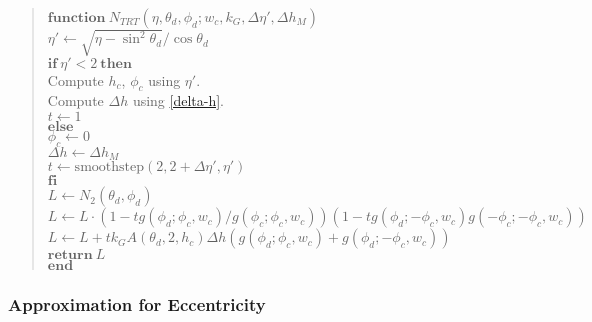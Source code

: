 \documentclass[10pt]{article}
\newcommand{\IF}{\mathbf{if}}
\newcommand{\FI}{\mathbf{fi}}
\newcommand{\THEN}{\mathbf{then}}
\newcommand{\ELSE}{\mathbf{else}}
\begin{document}
  \begin{verse}
    $\mathbf{function}\ N_{TRT}(\eta, \theta_d, \phi_d; w_c, k_G, \Delta \eta', \Delta h_M)$\\
    \quad $\eta' \gets \sqrt{\eta - \sin^2 \theta_d}/\cos \theta_d $\\
    \quad $\IF\ \eta' < 2\ \THEN$ \\
    \quad \quad Compute $h_c$, $\phi_c$ using $\eta'$.\\
    \quad \quad Compute $\Delta h$ using \eqref{delta-h}.\\
    \quad \quad $t \gets 1$\\
    \quad $\ELSE$\\
    \quad \quad $\phi_c \gets 0$\\
    \quad \quad $\Delta h \gets \Delta h_M$\\
    \quad \quad $t \gets \mathrm{smoothstep}(2, 2+\Delta\eta', \eta')$\\
    \quad $\FI$\\
    \quad $L \gets N_2(\theta_d, \phi_d)$\\
    \quad $L \gets L \cdot (1 - t g(\phi_d; \phi_c, w_c) / g(\phi_c;\phi_c, w_c)) (1 - t g(\phi_d; -\phi_c, w_c) g(-\phi_c; -\phi_c, w_c))$\\
    \quad $L \gets L + t k_G A(\theta_d, 2, h_c) \Delta h (g(\phi_d; \phi_c, w_c) + g(\phi_d; -\phi_c, w_c))$\\
    \quad $\mathbf{return}\ L$\\
    $\mathbf{end}$\\
  \end{verse}

  \subsubsection{Approximation for Eccentricity}
  
\end{document}
